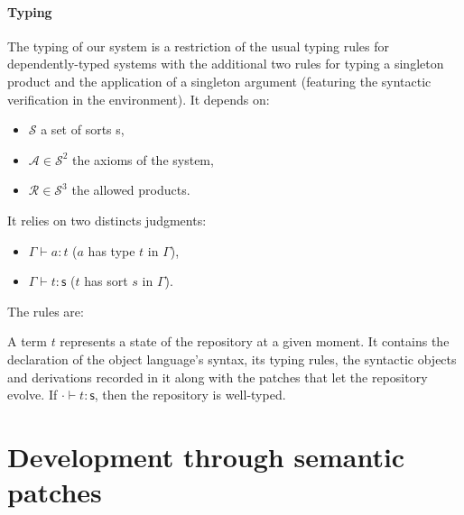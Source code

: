 \documentclass{article}
\newcommand{\sort}{\textsf{s}}
\newcommand{\subst}[2]{\{#1/#2\}}
\begin{document}
\paragraph{Typing} The typing of our system is a restriction of the
usual typing rules for dependently-typed systems with the additional
two rules for typing a singleton product and the application of a
singleton argument (featuring the syntactic verification in the
environment). It depends on: 
\begin{itemize}
  \item$\mathcal S$ a set of sorts \sort,
  \item$\mathcal A \in \mathcal S^2$ the axioms of the system,
  \item$\mathcal R \in \mathcal S^3$ the allowed products.
\end{itemize}
It relies on two distincts judgments:
\begin{itemize}
\item $\Gamma\vdash a : t$ ($a$ has type $t$ in $\Gamma$),
\item $\Gamma\vdash t : \sort$ ($t$ has sort $s$ in $\Gamma$).
\end{itemize}
The rules are:

A term $t$ represents a state of the repository at a given moment. It
contains the declaration of the object language's syntax, its typing
rules, the syntactic objects and derivations recorded in it along with
the patches that let the repository evolve. If $\cdot\vdash t:\sort$,
then the repository is well-typed.

\section{Development through semantic patches}
\end{document}
